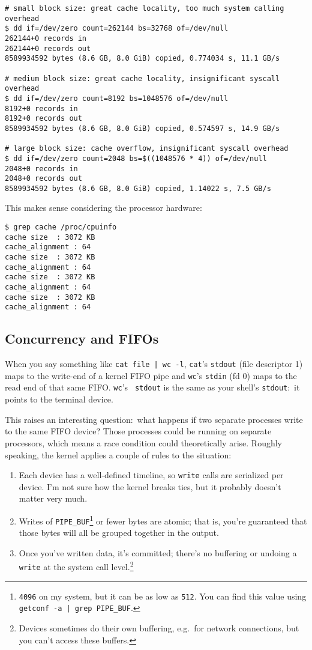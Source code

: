\begin{verbatim}
# small block size: great cache locality, too much system calling overhead
$ dd if=/dev/zero count=262144 bs=32768 of=/dev/null
262144+0 records in
262144+0 records out
8589934592 bytes (8.6 GB, 8.0 GiB) copied, 0.774034 s, 11.1 GB/s

# medium block size: great cache locality, insignificant syscall overhead
$ dd if=/dev/zero count=8192 bs=1048576 of=/dev/null
8192+0 records in
8192+0 records out
8589934592 bytes (8.6 GB, 8.0 GiB) copied, 0.574597 s, 14.9 GB/s

# large block size: cache overflow, insignificant syscall overhead
$ dd if=/dev/zero count=2048 bs=$((1048576 * 4)) of=/dev/null
2048+0 records in
2048+0 records out
8589934592 bytes (8.6 GB, 8.0 GiB) copied, 1.14022 s, 7.5 GB/s\end{verbatim}

This makes sense considering the processor hardware:

\begin{verbatim}
$ grep cache /proc/cpuinfo
cache size	: 3072 KB
cache_alignment	: 64
cache size	: 3072 KB
cache_alignment	: 64
cache size	: 3072 KB
cache_alignment	: 64
cache size	: 3072 KB
cache_alignment	: 64\end{verbatim}

\subsection{Concurrency and FIFOs}
When you say something like \verb/cat file | wc -l/, {\tt cat}'s {\tt stdout}
(file descriptor 1) maps to the write-end of a kernel FIFO pipe and {\tt wc}'s
{\tt stdin} (fd 0) maps to the read end of that same FIFO. {\tt wc}'s {\tt
stdout} is the same as your shell's {\tt stdout}:~it points to the terminal
device.

This raises an interesting question:~what happens if two separate processes
write to the same FIFO device? Those processes could be running on separate
processors, which means a race condition could theoretically arise. Roughly
speaking, the kernel applies a couple of rules to the situation:

\begin{enumerate}
  \item Each device has a well-defined timeline, so {\tt write} calls are
        serialized per device. I'm not sure how the kernel breaks ties, but it
        probably doesn't matter very much.
  \item Writes of \verb|PIPE_BUF|\footnote{{\tt 4096} on my system, but it can
        be as low as {\tt 512}. You can find this value using {\tt getconf -a |
        grep PIPE\_BUF}.} or fewer bytes are atomic; that is, you're guaranteed
        that those bytes will all be grouped together in the output.
  \item Once you've written data, it's committed; there's no buffering or
        undoing a {\tt write} at the system call level.\footnote{Devices
        sometimes do their own buffering, e.g.~for network connections, but you
        can't access these buffers.}
\end{enumerate}

